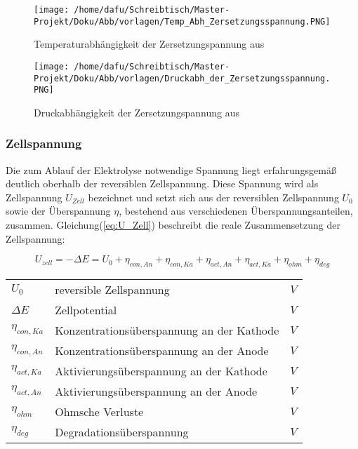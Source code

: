 \documentclass[onecolumn,10pt,titlepage]{article}
\begin{document}
	\begin{figure}[H]
		\centering
		\texttt{[image: /home/dafu/Schreibtisch/Master-Projekt/Doku/Abb/vorlagen/Temp\_Abh\_Zersetzungsspannung.PNG]}
		\caption[Temperaturabhängigkeit der Zersetzungspannung]{Temperaturabhängigkeit der Zersetzungspannung aus \cite{Kurzweil.2015}}
		\label{fig:Temperatur_U0}
	\end{figure}

	\begin{figure}[H]
		\centering
		\texttt{[image: /home/dafu/Schreibtisch/Master-Projekt/Doku/Abb/vorlagen/Druckabh\_der\_Zersetzungsspannung.PNG]}
		\caption[Druckabhängigkeit der Zersetzungspannung]{Druckabhängigkeit der Zersetzungspannung aus \cite{Kurzweil.2015}}
		\label{fig:Druck_U0}
	\end{figure}

	\subsubsection{Zellspannung}
	\label{subsub_Zellspann}

	Die zum Ablauf der Elektrolyse notwendige Spannung liegt erfahrungsgemäß \cite{Zhang.2010,Buttler.2018} deutlich oberhalb der reversiblen Zellspannung. Diese Spannung wird als Zellspannung $U_{Zell}$ bezeichnet und setzt sich aus der reversiblen Zellspannung $U_0$ sowie der Überspannung $\eta$, bestehend aus verschiedenen Überspannungsanteilen, zusammen. Gleichung(\ref{eq:U_Zell}) beschreibt die reale Zusammensetzung der Zellspannung:
	
	\begin{equation}
	U_{zell}= -\Delta E = U_0 + \eta_{con,An} + \eta_{con,Ka} + \eta_{act,An} + \eta_{act,Ka} + \eta_{ohm} + \eta_{deg}
	\label{eq:U_Zell}
	\end{equation}

	\begin{table}[H]
		\begin{tabular*}{\textwidth}{lll}\\
			$U_0$&reversible Zellspannung&$V$\\
			$\Delta E$&Zellpotential&$V$\\
			$\eta_{con,Ka}$&Konzentrationsüberspannung an der Kathode&$V$\\
			$\eta_{con,An}$&Konzentrationsüberspannung an der Anode&$V$\\
			$\eta_{act,Ka}$&Aktivierungsüberspannung an der Kathode&$V$\\
			$\eta_{act,An}$&Aktivierungsüberspannung an der Anode&$V$\\
			$\eta_{ohm}$&Ohmsche Verluste&$V$\\
			$\eta_{deg}$&Degradationsüberspannung&$V$\\
		\end{tabular*}
	\end{table}
\end{document}

